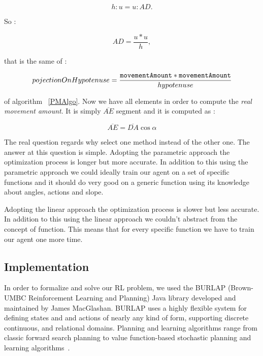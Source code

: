 \begin{equation}
	h : u =  u : AD.
\end{equation}

So :

\begin{equation}
	AD = \dfrac{u * u}{h},
\end{equation}

that is the same of :

\begin{equation}
	 pojectionOnHypotenuse = \dfrac{{\tt movementAmount} * {\tt movementAmount}}{hypotenuse}
\end{equation}

of algorithm ~\ref{PMAlgo}. Now we have all elements in order to compute the \textit{real movement amount}. It is simply $\overline{AE}$ segment and it is computed as :

\begin{equation}
	\overline{AE} = \overline{DA} \cos \alpha
\end{equation}

The real question regards why select one method instead of the other one. The answer at this question is simple. Adopting the parametric approach the optimization process is longer but more accurate. In addition to this using the parametric approach we could ideally train our agent on a set of specific functions and it should do very good on a generic function using its knowledge about angles, actions and slope. 

Adopting the linear approach the optimization process is slower but less accurate. In addition to this using the linear approach we couldn't abstract from the concept of function.  This means that for every specific function we have to train our agent one more time.

\subsection{Implementation}

In order to formalize and solve our RL problem, we used the BURLAP (Brown-UMBC Reinforcement Learning and Planning) Java library developed and maintained by James MacGlashan. BURLAP uses a highly flexible system for defining states and and actions of nearly any kind of form, supporting discrete continuous, and relational domains. Planning and learning algorithms range from classic forward search planning to value function-based stochastic planning and learning algorithms~\cite{BURLAPSite}. \\

